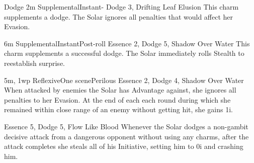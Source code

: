 \begin{Ability}{Dodge}
  {2m}
  {Supplemental}{Instant}{-}
  {Dodge 3, Drifting Leaf Elusion}
  This charm supplements a dodge. The Solar ignores all penalties that would affect her Evasion.

  {6m}
  {Supplemental}{Instant}{Post-roll}
  {Essence 2, Dodge 5, Shadow Over Water}
  This charm supplements a successful dodge. The Solar immediately rolls Stealth to reestablish surprise.

  {5m, 1wp}
  {Reflexive}{One scene}{Perilous}
  {Essence 2, Dodge 4, Shadow Over Water}
  When attacked by enemies the Solar has Advantage against, she ignores all penalties to her Evasion. At the end of each each round during which she remained within close range of an enemy without getting hit, she gains 1i.

  {Essence 5, Dodge 5, Flow Like Blood}
  Whenever the Solar dodges a non-gambit decisive attack from a dangerous opponent without using any charms, after the attack completes she steals all of his Initiative, setting him to 0i and crashing him.
\end{Ability}


